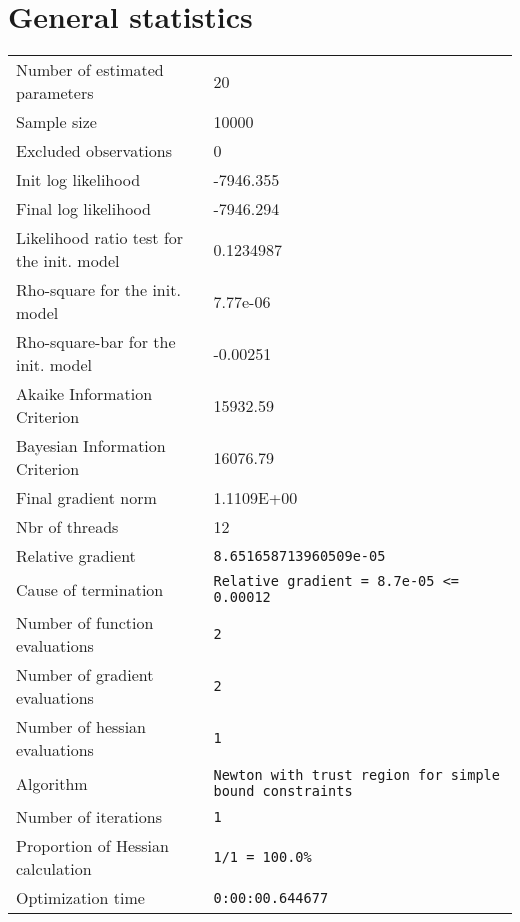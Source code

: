 



\section{General statistics}
\begin{tabular}{ll}
Number of estimated parameters & 20 \\
Sample size & 10000 \\
Excluded observations & 0 \\
Init log likelihood & -7946.355 \\
Final log likelihood & -7946.294 \\
Likelihood ratio test for the init. model & 0.1234987 \\
Rho-square for the init. model & 7.77e-06 \\
Rho-square-bar for the init. model & -0.00251 \\
Akaike Information Criterion & 15932.59 \\
Bayesian Information Criterion & 16076.79 \\
Final gradient norm & 1.1109E+00 \\
Nbr of threads & 12 \\
Relative gradient & \verb$8.651658713960509e-05$ \\
Cause of termination & \verb$Relative gradient = 8.7e-05 <= 0.00012$ \\
Number of function evaluations & \verb$2$ \\
Number of gradient evaluations & \verb$2$ \\
Number of hessian evaluations & \verb$1$ \\
Algorithm & \verb$Newton with trust region for simple bound constraints$ \\
Number of iterations & \verb$1$ \\
Proportion of Hessian calculation & \verb$1/1 = 100.0%$ \\
Optimization time & \verb$0:00:00.644677$ \\
\end{tabular}

